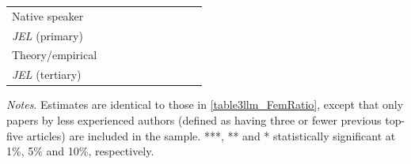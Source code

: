 \begin{table}
\begin{threeparttable}
\begin{tabular}{p{3cm}S@{}S@{}S@{}S@{}S@{}S@{}S@{}S@{}S@{}}
            Native speaker                &               &               &               &               &           {}   &           {}   &           {}   &           {}   &           {}   \\
            \textit{JEL} (primary)        &               &               &               &               &               &               &           {}   &               &               \\
            Theory/empirical              &               &               &               &               &               &               &               &           {}   &               \\
            \textit{JEL} (tertiary)       &               &               &               &               &               &               &               &               &           {}   \\
            \bottomrule
        \end{tabular}
        \begin{tablenotes}
            \tiny
            \item \textit{Notes}. Estimates are identical to those in \autoref{table3llm_FemRatio}, except that only papers by less experienced authors (defined as having three or fewer previous top-five articles) are included in the sample. ***, ** and * statistically significant at 1\%, 5\% and 10\%, respectively.
        \end{tablenotes}
    \end{threeparttable}
\end{table}
